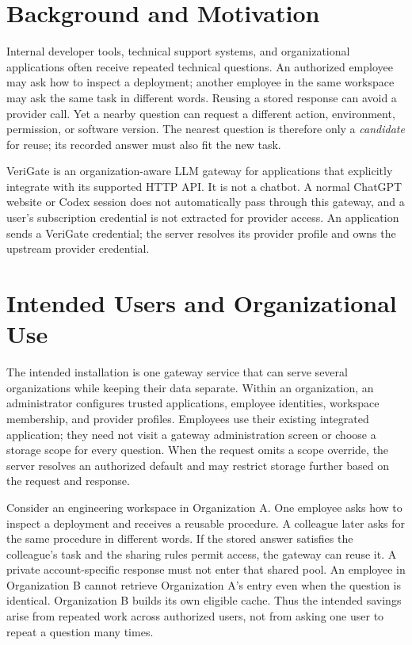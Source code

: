 \section{Background and Motivation}
Internal developer tools, technical support systems, and organizational applications often receive repeated technical questions. An authorized employee may ask how to inspect a deployment; another employee in the same workspace may ask the same task in different words. Reusing a stored response can avoid a provider call. Yet a nearby question can request a different action, environment, permission, or software version. The nearest question is therefore only a \emph{candidate} for reuse; its recorded answer must also fit the new task.

VeriGate is an organization-aware LLM gateway for applications that explicitly integrate with its supported HTTP API. It is not a chatbot. A normal ChatGPT website or Codex session does not automatically pass through this gateway, and a user's subscription credential is not extracted for provider access. An application sends a VeriGate credential; the server resolves its provider profile and owns the upstream provider credential.

\section{Intended Users and Organizational Use}
The intended installation is one gateway service that can serve several organizations while keeping their data separate. Within an organization, an administrator configures trusted applications, employee identities, workspace membership, and provider profiles. Employees use their existing integrated application; they need not visit a gateway administration screen or choose a storage scope for every question. When the request omits a scope override, the server resolves an authorized default and may restrict storage further based on the request and response.

Consider an engineering workspace in Organization A. One employee asks how to inspect a deployment and receives a reusable procedure. A colleague later asks for the same procedure in different words. If the stored answer satisfies the colleague's task and the sharing rules permit access, the gateway can reuse it. A private account-specific response must not enter that shared pool. An employee in Organization B cannot retrieve Organization A's entry even when the question is identical. Organization B builds its own eligible cache. Thus the intended savings arise from repeated work across authorized users, not from asking one user to repeat a question many times.

